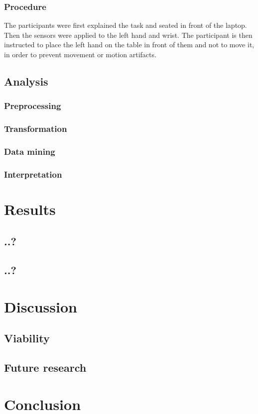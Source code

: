 \documentclass[12pt,fleqn,leqno,letterpaper]{article}
\begin{document}
\subsubsection{Procedure}
The participants were first explained the task and seated in front of the laptop. Then the sensors were applied to the left hand and wrist. The participant is then instructed to place the left hand on the table in front of them and not to move it, in order to prevent movement or motion artifacts.

\subsection{Analysis}
\subsubsection{Preprocessing}
\subsubsection{Transformation}
\subsubsection{Data mining}
\subsubsection{Interpretation}

\section{Results}
\subsection{..?}
\subsection{..?}

\section{Discussion}
\subsection{Viability}
\subsection{Future research}
\section{Conclusion}






\end{document}
